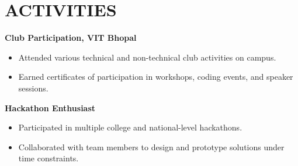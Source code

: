 \documentclass[a4paper,10pt]{article}
\begin{document}
\section*{ACTIVITIES}

\textbf{Club Participation, VIT Bhopal} \hfill \textit{} 
\begin{itemize}[leftmargin=1em]
    \item Attended various technical and non-technical club activities on campus.
    \item Earned certificates of participation in workshops, coding events, and speaker sessions.
\end{itemize}

\textbf{Hackathon Enthusiast} \hfill \textit{} 
\begin{itemize}[leftmargin=1em]
    \item Participated in multiple college and national-level hackathons.
    \item Collaborated with team members to design and prototype solutions under time constraints.
\end{itemize}


\end{document}
